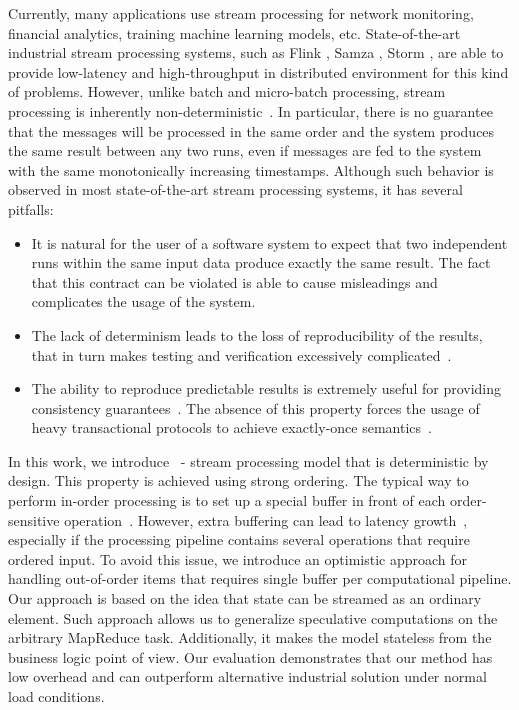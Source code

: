 
\label {fs-intro-seciton}

Currently, many  
applications use stream processing for network monitoring, financial analytics, training machine learning models, etc. 
State-of-the-art industrial stream processing systems, such as Flink \cite{carbone2015apache}, Samza \cite{Noghabi:2017:SSS:3137765.3137770}, Storm \cite{apache:storm}, are able to provide low-latency and high-throughput in distributed environment for this kind of problems. 
However, unlike batch and micro-batch processing, stream processing is inherently non-deterministic~\cite{Zaharia:2012:DSE:2342763.2342773}. 
In particular, there is no guarantee that the messages will be processed in the same order and the system produces the same result between any two runs, even if messages are fed to the system with the same monotonically increasing timestamps. 
Although such behavior is observed in most state-of-the-art stream processing systems, it has several 
pitfalls:

\begin{itemize}
 \item 
It is natural for the user of a software system to expect  that two independent runs within the same input data produce exactly the same result. The fact that this contract can be violated is able to cause misleadings and complicates the usage of the system.

    \item 
    The lack of determinism leads to the loss of reproducibility of the results, that in turn makes
    testing and verification excessively complicated~\cite{Zacheilas:2017:MDS:3093742.3093921}.
    \item 
    The ability to reproduce predictable results is extremely useful for providing consistency guarantees~\cite{Stonebraker:2005:RRS:1107499.1107504}. 
    The absence of this property forces the usage of heavy transactional protocols to achieve exactly-once semantics~\cite{Carbone:2017:SMA:3137765.3137777, jacques2016consistent}.
\end{itemize}

In this work, we introduce \FlameStream\ - stream processing model that is deterministic by design. This property is achieved using strong ordering. The typical way to perform in-order processing is to set up a special buffer in front of each order-sensitive operation~\cite{Li:2008:OPN:1453856.1453890}. However, extra buffering can lead to latency growth~\cite{Zacheilas:2017:MDS:3093742.3093921}, especially if the processing pipeline contains several operations that require ordered input. To avoid this issue, we introduce an optimistic approach for handling out-of-order items that requires single buffer per computational pipeline. Our approach is based on the idea that state can be streamed as an ordinary element. Such approach allows us to generalize speculative computations on the arbitrary MapReduce task. Additionally, it makes the model stateless from the business logic point of view. Our evaluation demonstrates that our method has low overhead and can outperform alternative industrial solution under normal load conditions.

